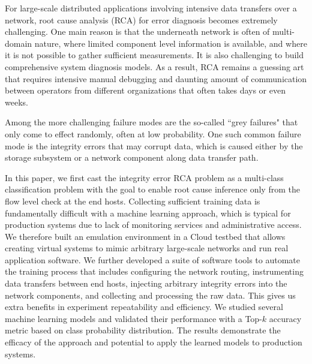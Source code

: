 For large-scale distributed applications involving intensive data transfers over a network, root cause analysis (RCA) for error diagnosis becomes extremely challenging. One main reason is that the underneath network is often of multi-domain nature, where limited component level information is available, and where it is not possible to gather sufficient measurements. It is also challenging to build comprehensive system diagnosis models. As a result, RCA remains a guessing art that requires intensive manual debugging and daunting amount of communication between operators from different organizations that often takes days or even weeks.  

Among the more challenging failure modes are the so-called ``grey failures" that only come to effect randomly, often at low probability. One such common failure mode is the integrity errors that may corrupt data, which is caused either by the storage subsystem or a network component along data transfer path. 

In this paper, we first cast the integrity error RCA problem as a multi-class classification problem with the goal to enable root cause inference only from the flow level check at the end hosts. Collecting sufficient training data is fundamentally difficult with a machine learning approach, which is typical for production systems due to lack of monitoring services and administrative access. We therefore built an emulation environment in a Cloud testbed that allows creating virtual systems to mimic arbitrary large-scale networks and run real application software. We further developed a suite of software tools to automate the training process that includes configuring the network routing, instrumenting data transfers between end hosts, injecting arbitrary integrity errors into the network components, and collecting and processing the raw data. This gives us extra benefits in experiment repeatability and efficiency. We studied several machine learning models and validated their performance with a Top-$k$ accuracy metric based on class probability distribution. The results demonstrate the efficacy of the approach and potential to apply the learned models to production systems.  

